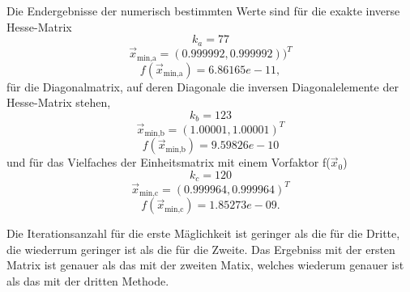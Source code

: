   Die Endergebnisse der numerisch bestimmten Werte sind für die  exakte inverse Hesse-Matrix
  $$k_a = 77 $$
  $$ \vec{x}_\text{min,a}= (0.999992 , 0.999992))^T $$
  $$f(\vec{x}_\text{min,a})=6.86165e-11, $$
  für die Diagonalmatrix, auf deren Diagonale die inversen Diagonalelemente der Hesse-Matrix stehen,
  $$k_b= 123$$
  $$\vec{x}_\text{min,b}=(1.00001 , 1.00001)^T$$
  $$f(\vec{x}_\text{min,b})=9.59826e-10$$
  und für das Vielfaches der Einheitsmatrix mit einem Vorfaktor f($\vec{x}_0$)
  $$k_c= 120$$
  $$\vec{x}_\text{min,c}=(0.999964 , 0.999964)^T$$
  $$ f(\vec{x}_\text{min,c})=1.85273e-09.$$

  Die Iterationsanzahl für die erste Mäglichkeit ist geringer als die für die Dritte, die wiederrum geringer ist als die für die Zweite.
  Das Ergebniss mit der ersten Matrix ist genauer als das mit der zweiten Matix, welches wiederum genauer ist als das mit der dritten Methode.
